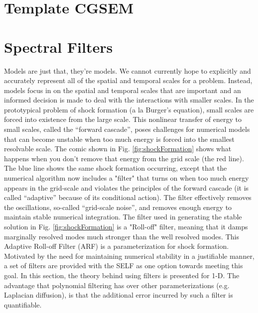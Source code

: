 \documentclass[12pt]{softwaremanual}
\begin{document}
\section{Template CGSEM}

\section{Spectral Filters}
Models are just that, they're models. We cannot currently hope to explicitly and accurately represent all of the spatial and temporal scales for a problem. Instead, models focus in on the spatial and temporal scales that are important and an informed decision is made to deal with the interactions with smaller scales. In the prototypical problem of shock formation (a la Burger's equation), small scales are forced into existence from the large scale. This nonlinear transfer of energy to small scales, called the ``forward cascade'', poses challenges for numerical models that can become unstable when too much energy is forced into the smallest resolvable scale. The comic shown in Fig. \ref{fig:shockFormation} shows what happens when you don't remove that energy from the grid scale (the red line). The blue line shows the same shock formation occurring, except that the numerical algorithm now includes a "filter" that turns on when too much energy appears in the grid-scale and violates the principles of the forward cascade (it is called ``adaptive'' because of its conditional action). The filter effectively removes the oscillations, so-called ``grid-scale noise'', and removes enough energy to maintain stable numerical integration. The filter used in generating the stable solution in Fig. \ref{fig:shockFormation} is a "Roll-off" filter, meaning that it damps marginally resolved modes much stronger than the well resolved modes. This Adaptive Roll-off Filter (ARF) is a parameterization for shock formation. Motivated by the need for maintaining numerical stability in a justifiable manner, a set of filters are provided with the SELF as one option towards meeting this goal. In this section, the theory behind using filters is presented for 1-D. The advantage that polynomial filtering has over other parameterizations (e.g. Laplacian diffusion), is that the additional error incurred by such a filter is quantifiable.
\end{document}
